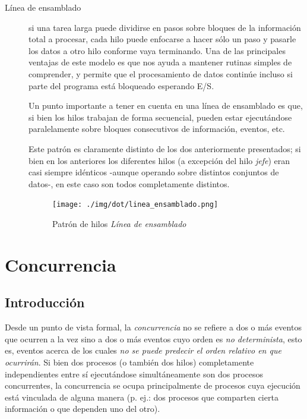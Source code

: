 \documentclass[11pt,fleqn]{book} %
\begin{document}
\begin{description}
\item[Línea de ensamblado] si una tarea larga puede dividirse en pasos
     sobre bloques de la información total a procesar, cada hilo puede
     enfocarse a hacer sólo un paso y pasarle los datos a otro hilo
     conforme vaya terminando. Una de las principales ventajas de este
     modelo es que nos ayuda a mantener rutinas simples de comprender,
     y permite que el procesamiento de datos continúe incluso si parte
     del programa está bloqueado esperando E/S.

     Un punto importante a tener en cuenta en una línea de ensamblado
     es que, si bien los hilos trabajan de forma secuencial, pueden
     estar ejecutándose paralelamente sobre bloques consecutivos de
     información, eventos, etc.

     Este patrón es claramente distinto de los dos anteriormente
     presentados; si bien en los anteriores los diferentes hilos (a
     excepción del hilo \emph{jefe}) eran casi siempre idénticos -aunque
     operando sobre distintos conjuntos de datos-, en este caso son
     todos completamente distintos.

     \begin{figure}[htb]
     \centering
     \texttt{[image: ./img/dot/linea\_ensamblado.png]}
     \caption{\label{PROC_linea_ensamblado}Patrón de hilos \emph{Línea de ensamblado}}
     \end{figure}
\end{description}
\section{Concurrencia}
\label{sec-3-3}
\label{PROC_concurrencia}
\subsection{Introducción}
\label{sec-3-3-1}


Desde un punto de vista formal, la \emph{concurrencia} no se refiere a dos
o más eventos que ocurren a la vez sino a dos o más eventos cuyo orden
es \emph{no determinista}, esto es, eventos acerca de los cuales \emph{no se puede predecir el orden relativo en que ocurrirán}. Si bien dos
procesos (o también dos hilos) completamente independientes entre sí
ejecutándose simultáneamente son dos procesos concurrentes, la
concurrencia se ocupa principalmente de procesos cuya ejecución está
vinculada de alguna manera (p. ej.: dos procesos que comparten cierta
información o que dependen uno del otro).
\end{document}
